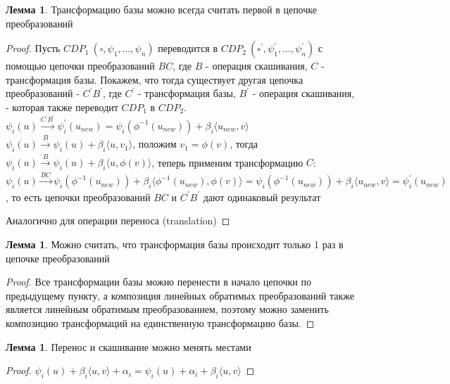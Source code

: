 \documentclass[fontsize=14pt]{scrartcl}
\theoremstyle{definition}
\newtheorem{lemma}[theorem]{Лемма}
\begin{document}
\begin{lemma}
\label{transform_is_first}
	Трансформацию базы можно всегда считать первой в цепочке преобразований
\end{lemma}
\begin{proof}
	Пусть $CDP_1\ (\square, \psi_1, ..., \psi_n)$ переводится в $CDP_2\ (\square^{'}, \psi_1^{'}, ..., \psi_n^{'})$ с помощью цепочки преобразований $BC$, где $B$ - операция скашивания, $C$ - трансформация базы. Покажем, что тогда существует другая цепочка преобразований - $C^{'}B^{'}$, где  $C^{'}$ - трансформация базы, $B^{'}$ - операция скашивания, - которая также переводит $CDP_1$ в $CDP_2$.
\\
$\psi_i(u) \xrightarrow[]{C^{'}B^{'}} \psi_i^{'}(u_{new}) = \psi_i(\phi^{-1}(u_{new})) + \beta_i\langle u_{new}, v\rangle $
\\
$\psi_i(u) \xrightarrow[]{B} \psi_i(u) + \beta_i \langle u, v_1 \rangle$, положим $v_1 = \phi(v)$, тогда $\psi_i(u) \xrightarrow[]{B} \psi_i(u) + \beta_i\langle u, \phi(v)\rangle$, теперь применим трансформацию $C$: 
$\psi_i(u) \xrightarrow[]{BC} \psi_i(\phi^{-1}(u_{new})) + \beta_i\langle \phi^{-1}(u_{new}), \phi(v)\rangle = \psi_i(\phi^{-1}(u_{new})) + \beta_i\langle u_{new}, v\rangle = \psi_i^{'}(u_{new})$, то есть цепочки преобразований $BC$ и $C^{'}B^{'}$ дают одинаковый результат

Аналогично для операции переноса (translation)
\end{proof}

\begin{lemma}
\label{unite}
Можно считать, что трансформация базы происходит только 1 раз в цепочке преобразований
\end{lemma}
\begin{proof}
	Все трансформации базы можно перенести в начало цепочки по предыдущему пункту, а композиция линейных обратимых преобразований также является линейным обратимым преобразованием, поэтому можно заменить композицию трансформаций на единственную трансформацию базы.

\end{proof}

\begin{lemma}
\label{reorder}
	Перенос и скашивание можно менять местами
\end{lemma}
\begin{proof}
	$\psi_i(u) + \beta_i\langle u, v\rangle + \alpha_i = \psi_i(u) + \alpha_i + \beta_i\langle u, v\rangle$
\end{proof}
\end{document}
